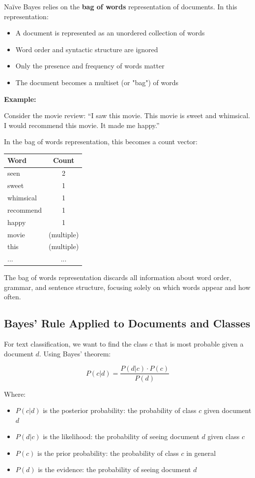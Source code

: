 \documentclass[11pt,a4paper]{article}
\theoremstyle{definition}
\theoremstyle{plain}
\theoremstyle{remark}
\begin{document}
Naïve Bayes relies on the \textbf{bag of words} representation of documents. In this representation:

\begin{itemize}
    \item A document is represented as an unordered collection of words
    \item Word order and syntactic structure are ignored
    \item Only the presence and frequency of words matter
    \item The document becomes a multiset (or "bag") of words
\end{itemize}

\textbf{Example:}

Consider the movie review: ``I saw this movie. This movie is sweet and whimsical. I would recommend this movie. It made me happy.''

In the bag of words representation, this becomes a count vector:

\begin{center}
\begin{tabular}{|l|c|}
\hline
\textbf{Word} & \textbf{Count} \\
\hline
seen & 2 \\
sweet & 1 \\
whimsical & 1 \\
recommend & 1 \\
happy & 1 \\
movie & (multiple) \\
this & (multiple) \\
... & ... \\
\hline
\end{tabular}
\end{center}

The bag of words representation discards all information about word order, grammar, and sentence structure, focusing solely on which words appear and how often.

\subsection{Bayes' Rule Applied to Documents and Classes}

For text classification, we want to find the class $c$ that is most probable given a document $d$. Using Bayes' theorem:

\[
P(c|d) = \frac{P(d|c) \cdot P(c)}{P(d)}
\]

Where:
\begin{itemize}
    \item $P(c|d)$ is the posterior probability: the probability of class $c$ given document $d$
    \item $P(d|c)$ is the likelihood: the probability of seeing document $d$ given class $c$
    \item $P(c)$ is the prior probability: the probability of class $c$ in general
    \item $P(d)$ is the evidence: the probability of seeing document $d$
\end{itemize}
\end{document}

